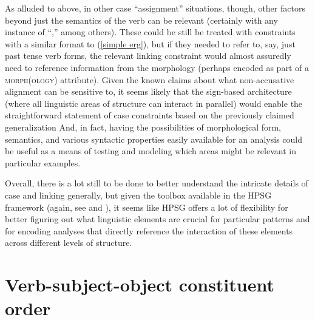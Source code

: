 \documentclass[output=paper]{langsci/langscibook}
\begin{document}
{As alluded to above, in other case ``assignment'' situations, though, other factors beyond just the semantics of the verb can be relevant (certainly with any instance of ``,'' among others). These could be still be treated with constraints with a similar format to (\ref{simple erg}), but if they needed to refer to, say, just past tense verb forms, the relevant linking constraint would almost assuredly need to reference information from the morphology (perhaps encoded as part of a \textsc{morph(ology)} attribute). Given the known claims about what non-accusative alignment can be sensitive to,  it seems likely that the sign-based architecture (where all linguistic areas of structure can interact in parallel) would enable the straightforward statement of case constraints based on the previously claimed generalization And, in fact, having the possibilities of morphological form, semantics, and various syntactic properties easily available for an analysis could be useful as a means of testing and modeling which areas might be relevant in particular examples.

Overall, there is a lot still to be done to better understand the intricate details of case and linking generally, but given the toolbox available in the HPSG framework (again, see  and ), it seems like HPSG offers a lot of flexibility for better figuring out what linguistic elements are crucial for particular patterns and for encoding analyses that directly reference the interaction of these elements across different levels of structure.      

\section{Verb-subject-object constituent order}

}
\end{document}
